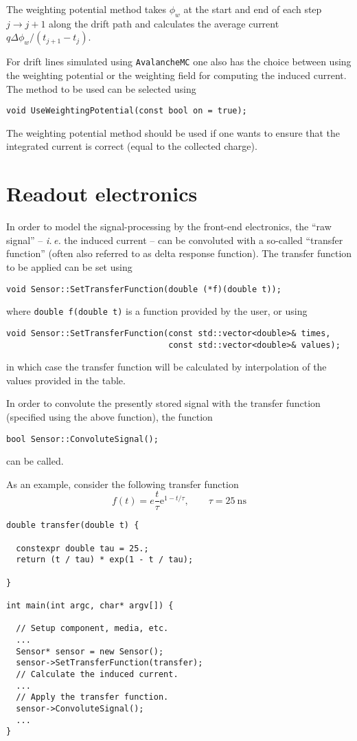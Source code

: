 The weighting potential method takes $\phi_{w}$ 
at the start and end of each step $j \rightarrow j + 1$ along the drift path
and calculates the average current $q\Delta\phi_{w}/\left(t_{j+1} - t_{j}\right)$.

For drift lines simulated using \texttt{AvalancheMC} one also has the choice 
between using the weighting potential or the weighting field for computing 
the induced current. The method to be used can be selected using
\begin{lstlisting}
void UseWeightingPotential(const bool on = true);
\end{lstlisting} 
The weighting potential method should be used if one wants to ensure that 
the integrated current is correct (equal to the collected charge).
\section{Readout electronics}

In order to model the signal-processing by the front-end electronics, the 
``raw signal'' -- \textit{i.\,e.} the induced current -- 
can be convoluted with a so-called ``transfer function'' (often also referred 
to as delta response function). 
The transfer function to be applied can be set using
\begin{lstlisting}
void Sensor::SetTransferFunction(double (*f)(double t));
\end{lstlisting}
where \texttt{double f(double t)} is a function provided by the user, 
or using
\begin{lstlisting}
void Sensor::SetTransferFunction(const std::vector<double>& times,
                                 const std::vector<double>& values);
\end{lstlisting}
in which case the transfer function will be calculated by 
interpolation of the values provided in the table.

In order to convolute the presently stored signal with the 
transfer function (specified using the above function), 
the function
\begin{lstlisting}
bool Sensor::ConvoluteSignal();
\end{lstlisting}
can be called. 

As an example, consider the following transfer function
\begin{equation*}
  f\left(t\right) = e\frac{t}{\tau}\text{e}^{1 - t/\tau}, \qquad
  \tau = 25~\text{ns}
\end{equation*}

\begin{lstlisting}
double transfer(double t) {

  constexpr double tau = 25.;
  return (t / tau) * exp(1 - t / tau);

}

int main(int argc, char* argv[]) {

  // Setup component, media, etc.
  ...
  Sensor* sensor = new Sensor();
  sensor->SetTransferFunction(transfer);
  // Calculate the induced current.
  ...
  // Apply the transfer function.
  sensor->ConvoluteSignal();
  ...
}
 
\end{lstlisting}

